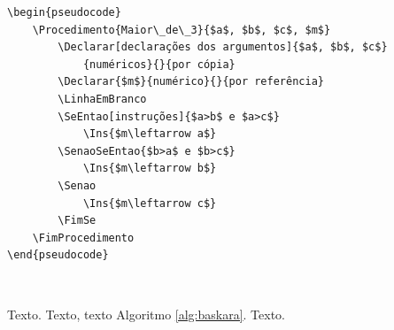 \documentclass[a4paper,12pt,oneside,onecolumn,final,fleqn]{repUERJ}
\begin{document}
\begin{verbatim}
\begin{pseudocode}
    \Procedimento{Maior\_de\_3}{$a$, $b$, $c$, $m$}
        \Declarar[declarações dos argumentos]{$a$, $b$, $c$}
            {numéricos}{}{por cópia}
        \Declarar{$m$}{numérico}{}{por referência}
        \LinhaEmBranco
        \SeEntao[instruções]{$a>b$ e $a>c$}
            \Ins{$m\leftarrow a$}
        \SenaoSeEntao{$b>a$ e $b>c$}
            \Ins{$m\leftarrow b$}
        \Senao
            \Ins{$m\leftarrow c$}
        \FimSe
    \FimProcedimento
\end{pseudocode}
\end{verbatim}

\noindent{}



~ \newline

\par Texto. Texto, texto Algoritmo \ref{alg:baskara}. Texto. 
\end{document}
